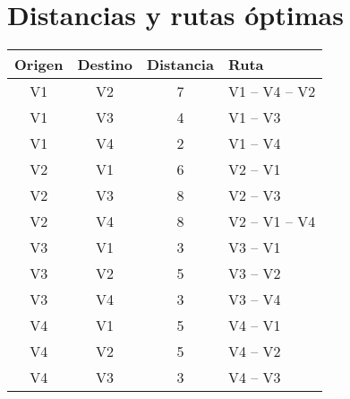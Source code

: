 \documentclass[a4paper,11pt]{article}
\begin{document}
\section*{Distancias y rutas \'optimas}
\begin{longtable}{c c c p{7cm}}
\hline
Origen & Destino & Distancia & Ruta \\\hline
\endhead
V1 & V2 & 7 & V1 -- V4 -- V2 \\
V1 & V3 & 4 & V1 -- V3 \\
V1 & V4 & 2 & V1 -- V4 \\
V2 & V1 & 6 & V2 -- V1 \\
V2 & V3 & 8 & V2 -- V3 \\
V2 & V4 & 8 & V2 -- V1 -- V4 \\
V3 & V1 & 3 & V3 -- V1 \\
V3 & V2 & 5 & V3 -- V2 \\
V3 & V4 & 3 & V3 -- V4 \\
V4 & V1 & 5 & V4 -- V1 \\
V4 & V2 & 5 & V4 -- V2 \\
V4 & V3 & 3 & V4 -- V3 \\
\hline
\end{longtable}
\end{document}
